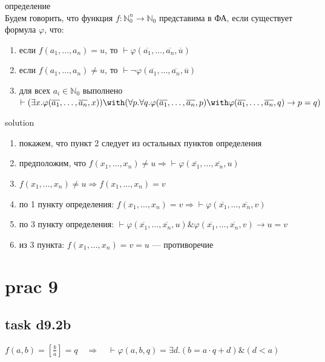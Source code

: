 \documentclass[12pt]{article}
\begin{document}
определение\\

Будем говорить, что функция $f: \mathbb{N}^n_0\to\mathbb{N}_0$ представима в ФА, 
если существует формула $\varphi$, что:
\begin{enumerate}
\item если $f(a_1,\dots,a_n) = u$, то $\vdash \varphi(\overline{a_1},\dots,\overline{a_n},\overline{u})$
\item если $f(a_1,\dots,a_n) \ne u$, то $\vdash \neg\varphi(\overline{a_1},\dots,\overline{a_n},\overline{u})$
\item для всех $a_i \in \mathbb{N}_0$ выполнено\\ $\vdash (\exists x.\varphi(\overline{a_1},\dots,\overline{a_n},x)) \with 
   (\forall p.\forall q.\varphi(\overline{a_1},\dots,\overline{a_n},p)\with \varphi(\overline{a_1},\dots,\overline{a_n},q)\rightarrow p=q)$
\end{enumerate}

solution

\begin{enumerate}
    \item покажем, что пункт 2 следует из остальных пунктов определения

    \item предположим, что $f(x_1,\dots,x_n) \neq u \Rightarrow \vdash \varphi(\overline{x_1},\dots,\overline{x_n},u)$

    \item $f(x_1,\dots,x_n) \neq u \Rightarrow f(x_1,\dots,x_n) = v$

    \item по 1 пункту определения: $f(x_1,\dots,x_n) = v\Rightarrow \vdash \varphi(\overline{x_1},\dots,\overline{x_n},v)$

    \item по 3 пункту определения: $\vdash \varphi(\overline{x_1},\dots,\overline{x_n},u) \& \varphi(\overline{x_1},\dots,\overline{x_n},v)\rightarrow u=v$

    \item из 3 пункта: $f(x_1,\dots,x_n) = v = u$ --- противоречие
\end{enumerate}


\section*{prac 9}

\subsection*{task d9.2b}

$f(a,b) = [\frac{b}{a}]=q\quad\Rightarrow\quad\vdash\varphi(a,b,q)=\exists d.(b=a\cdot q + d)\&(d<a)$
\end{document}
